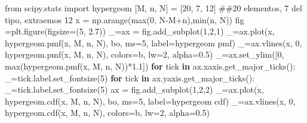 \documentclass[
  letterpaper,
  DIV=11,
  numbers=noendperiod]{scrreprt}
\newenvironment{Shaded}{\begin{snugshade}}{\end{snugshade}}
\newcommand{\BuiltInTok}[1]{\textcolor[rgb]{0.00,0.23,0.31}{#1}}
\newcommand{\CommentTok}[1]{\textcolor[rgb]{0.37,0.37,0.37}{#1}}
\newcommand{\ControlFlowTok}[1]{\textcolor[rgb]{0.00,0.23,0.31}{\textbf{#1}}}
\newcommand{\DecValTok}[1]{\textcolor[rgb]{0.68,0.00,0.00}{#1}}
\newcommand{\FloatTok}[1]{\textcolor[rgb]{0.68,0.00,0.00}{#1}}
\newcommand{\ImportTok}[1]{\textcolor[rgb]{0.00,0.46,0.62}{#1}}
\newcommand{\KeywordTok}[1]{\textcolor[rgb]{0.00,0.23,0.31}{\textbf{#1}}}
\newcommand{\NormalTok}[1]{\textcolor[rgb]{0.00,0.23,0.31}{#1}}
\newcommand{\OperatorTok}[1]{\textcolor[rgb]{0.37,0.37,0.37}{#1}}
\newcommand{\StringTok}[1]{\textcolor[rgb]{0.13,0.47,0.30}{#1}}
\begin{document}
\begin{Shaded}
\begin{Highlighting}[]
\ImportTok{from}\NormalTok{ scipy.stats }\ImportTok{import}\NormalTok{ hypergeom}
\NormalTok{[M, n, N] }\OperatorTok{=}\NormalTok{ [}\DecValTok{20}\NormalTok{, }\DecValTok{7}\NormalTok{, }\DecValTok{12}\NormalTok{] }\CommentTok{\#\#20 elementos, 7 del tipo, extraemos 12}
\NormalTok{x }\OperatorTok{=}\NormalTok{ np.arange(}\BuiltInTok{max}\NormalTok{(}\DecValTok{0}\NormalTok{, N}\OperatorTok{{-}}\NormalTok{M}\OperatorTok{+}\NormalTok{n),}\BuiltInTok{min}\NormalTok{(n, N))}
\NormalTok{fig }\OperatorTok{=}\NormalTok{plt.figure(figsize}\OperatorTok{=}\NormalTok{(}\DecValTok{5}\NormalTok{, }\FloatTok{2.7}\NormalTok{))}
\NormalTok{\_}\OperatorTok{=}\NormalTok{ax }\OperatorTok{=}\NormalTok{ fig.add\_subplot(}\DecValTok{1}\NormalTok{,}\DecValTok{2}\NormalTok{,}\DecValTok{1}\NormalTok{)}
\NormalTok{\_}\OperatorTok{=}\NormalTok{ax.plot(x, hypergeom.pmf(x, M, n, N), }\StringTok{\textquotesingle{}bo\textquotesingle{}}\NormalTok{, ms}\OperatorTok{=}\DecValTok{5}\NormalTok{, label}\OperatorTok{=}\StringTok{\textquotesingle{}hypergeom pmf\textquotesingle{}}\NormalTok{)}
\NormalTok{\_}\OperatorTok{=}\NormalTok{ax.vlines(x, }\DecValTok{0}\NormalTok{, hypergeom.pmf(x, M, n, N), colors}\OperatorTok{=}\StringTok{\textquotesingle{}b\textquotesingle{}}\NormalTok{, lw}\OperatorTok{=}\DecValTok{2}\NormalTok{, alpha}\OperatorTok{=}\FloatTok{0.5}\NormalTok{)}
\NormalTok{\_}\OperatorTok{=}\NormalTok{ax.set\_ylim([}\DecValTok{0}\NormalTok{, }\BuiltInTok{max}\NormalTok{(hypergeom.pmf(x, M, n, N))}\OperatorTok{*}\FloatTok{1.1}\NormalTok{])}
\ControlFlowTok{for}\NormalTok{ tick }\KeywordTok{in}\NormalTok{ ax.xaxis.get\_major\_ticks():}
\NormalTok{  \_}\OperatorTok{=}\NormalTok{tick.label.set\_fontsize(}\DecValTok{5}\NormalTok{)}
\ControlFlowTok{for}\NormalTok{ tick }\KeywordTok{in}\NormalTok{ ax.yaxis.get\_major\_ticks():}
\NormalTok{  \_}\OperatorTok{=}\NormalTok{tick.label.set\_fontsize(}\DecValTok{5}\NormalTok{) }
\NormalTok{ax }\OperatorTok{=}\NormalTok{ fig.add\_subplot(}\DecValTok{1}\NormalTok{,}\DecValTok{2}\NormalTok{,}\DecValTok{2}\NormalTok{)}
\NormalTok{\_}\OperatorTok{=}\NormalTok{ax.plot(x, hypergeom.cdf(x, M, n, N), }\StringTok{\textquotesingle{}bo\textquotesingle{}}\NormalTok{, ms}\OperatorTok{=}\DecValTok{5}\NormalTok{, label}\OperatorTok{=}\StringTok{\textquotesingle{}hypergeom cdf\textquotesingle{}}\NormalTok{)}
\NormalTok{\_}\OperatorTok{=}\NormalTok{ax.vlines(x, }\DecValTok{0}\NormalTok{, hypergeom.cdf(x, M, n, N), colors}\OperatorTok{=}\StringTok{\textquotesingle{}b\textquotesingle{}}\NormalTok{, lw}\OperatorTok{=}\DecValTok{2}\NormalTok{, alpha}\OperatorTok{=}\FloatTok{0.5}\NormalTok{)}

\end{Highlighting}
\end{Shaded}
\end{document}
